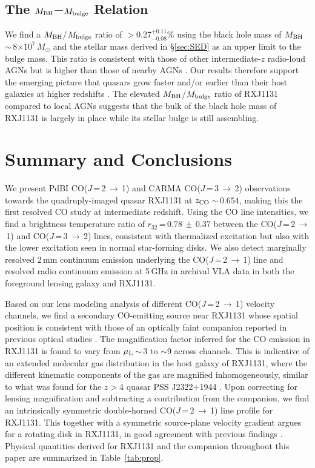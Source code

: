 \documentclass[]{emulateapj}
\newcommand{\mbulge}{\mbox{$M_{\rm bulge}$}\xspace}
\newcommand{\Msun}{\mbox{$M_{\odot}$}\xspace}
\newcommand{\rarr}{$\rightarrow$}
\newcommand{\bco}{\mbox{CO($J$\,=\,2\,\rarr\,1)}\xspace}
\newcommand{\cco}{\mbox{CO($J$\,=\,3\,\rarr\,2)}\xspace}
\newcommand{\E}[1]{\mbox{$\times10^{#1}$}}
\newcommand{\petm}[2]{$^{+#1}_{-#2}$}
\newcommand{\eq}{\,=\,}
\newcommand{\ssim}{\,$\sim$\,}
\newcommand{\Tab}[1]{Table~\ref{tab:#1}}
\newcommand{\Sec}[1]{\S\ref{sec:#1}}
\begin{document}
\subsection{The $M_{\rm BH}$$-$\mbulge Relation}
We find a $M_{\rm BH}$$/$$M_{\rm bulge}$ ratio of $>$0.27\petm{0.11}{0.08}\%
using the black hole mass of $M_{\rm BH}$\ssim8\E{7}\,\Msun \citep{Sluse12a}
and the stellar mass derived in \Sec{SED} as an upper limit to the bulge mass.
This ratio is consistent with those of other intermediate-$z$ radio-loud AGNs \citep{McLure06a}
but is higher than those of nearby AGNs \citep{HR04a}.
Our results therefore support
the emerging picture that quasars
grow faster and/or earlier than their host galaxies at higher redshifts \citep[e.g., ][]{Walter04a, Peng06a, McLure06a,Riechers08a}.
The elevated $M_{\rm BH}$$/$$M_{\rm bulge}$ ratio of RXJ1131 compared to local AGNs
suggests that the bulk of the black hole mass of RXJ1131 is largely in place while its stellar bulge is still assembling.

\section{Summary and Conclusions} \label{sec:sum}
We present PdBI \bco and CARMA \cco observations towards the
quadruply-imaged quasar RXJ1131 at $z_{\rm CO}$\ssim$0.654$, making this the first
resolved CO study at intermediate redshift.
Using the CO line intensities, we find a brightness temperature ratio of $r_{32}$\eq$0.78\,\pm\,0.37$
between the \bco and \cco lines,
consistent with thermalized excitation but also with the lower excitation seen in normal star-forming disks.
We also detect marginally resolved
2\,mm continuum emission underlying the \bco line
and resolved radio continuum emission at 5\,GHz in archival VLA data
in both the foreground lensing galaxy and RXJ1131.

Based on our lens modeling analysis of different \bco velocity channels,
we find a secondary CO-emitting source near RXJ1131 whose spatial position
is consistent with those of an optically faint companion reported in previous optical studies
.
The magnification factor inferred for the CO emission in RXJ1131 is found to
vary from $\mu_{\rm L}$\ssim3 to $\sim$9 across channels. This is indicative of an extended molecular gas
distribution in the host galaxy of RXJ1131, where the different kinematic components
of the gas are magnified inhomogeneously, similar to what was found for the $z$$>$4 quasar
PSS J2322$+$1944 \citep{Riechers08a}.
Upon correcting for lensing magnification and subtracting a contribution from the companion,
we find an intrinsically symmetric double-horned \bco line profile for RXJ1131.
This together with a symmetric source-plane velocity gradient argues for a rotating disk in RXJ1131, in good agreement with previous findings . Physical quantities derived for RXJ1131 and the companion throughout this paper are summarized in \Tab{prop}.
\end{document}
